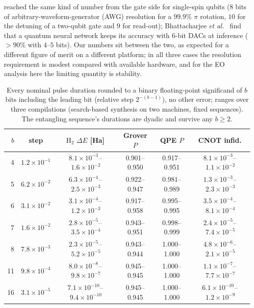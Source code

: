 \documentclass[reprint,aps,pra,amsmath,amssymb,superscriptaddress,letterpaper]{revtex4-2}
\newcommand{\Hz}{\mathrm{H}_2}
\begin{document}
reached the same kind of number from the gate side for single-spin qubits
($8$ bits of arbitrary-waveform-generator (AWG) resolution for a $99.9\%$ $\pi$ rotation, $10$ for the detuning of a two-qubit gate and $9$ for read-out); Bhattacharjee \emph{et al.}~\cite{bhattacharjee2026} find that a quantum neural network keeps its accuracy with $6$-bit DACs at inference ($>90\%$ with $4$--$5$ bits). Our numbers sit between the two, as expected for a different figure of merit on a different platform; in all three cases the resolution requirement is modest compared with available hardware, and for the EO analysis here the limiting quantity is stability.

\begin{table}[t]
\centering\small
\caption{Every nominal pulse duration rounded to a binary floating-point significand of $b$ bits including the leading bit (relative step $2^{-(b-1)}$), no other error; ranges over three compilations (search-based synthesis on two machines, fixed sequences). The entangling sequence's durations are dyadic and survive any $b\ge2$.}
\label{tab:fp}
\begin{tabular}{rccccc}
\toprule
$b$ & step & $\Hz$ $\Delta E$ [Ha] & Grover $P$ & QPE $P$ & CNOT infid.\\
\midrule
4 & $1.2\times10^{-1}$ & $8.1\times10^{-3}$--$\,1.6\times10^{-2}$ & 0.901--0.950 & 0.917--0.951 & $8.1\times10^{-3}$--$\,1.1\times10^{-2}$ \\
5 & $6.2\times10^{-2}$ & $6.3\times10^{-4}$--$\,2.5\times10^{-3}$ & 0.922--0.947 & 0.981--0.989 & $1.3\times10^{-3}$--$\,2.3\times10^{-3}$ \\
6 & $3.1\times10^{-2}$ & $3.1\times10^{-4}$--$\,1.2\times10^{-3}$ & 0.917--0.958 & 0.995--0.995 & $3.5\times10^{-4}$--$\,8.1\times10^{-4}$ \\
7 & $1.6\times10^{-2}$ & $2.8\times10^{-5}$--$\,3.5\times10^{-4}$ & 0.943--0.951 & 0.998--0.999 & $2.4\times10^{-5}$--$\,7.4\times10^{-5}$ \\
8 & $7.8\times10^{-3}$ & $2.3\times10^{-5}$--$\,5.2\times10^{-5}$ & 0.943--0.944 & 1.000--1.000 & $4.8\times10^{-6}$--$\,2.1\times10^{-5}$ \\
11 & $9.8\times10^{-4}$ & $8.0\times10^{-8}$--$\,9.8\times10^{-7}$ & 0.945--0.945 & 1.000--1.000 & $1.1\times10^{-7}$--$\,7.7\times10^{-7}$ \\
16 & $3.1\times10^{-5}$ & $7.1\times10^{-10}$--$\,9.4\times10^{-10}$ & 0.945--0.945 & 1.000--1.000 & $6.1\times10^{-10}$--$\,1.2\times10^{-9}$ \\
\bottomrule
\end{tabular}
\end{table}
\end{document}
